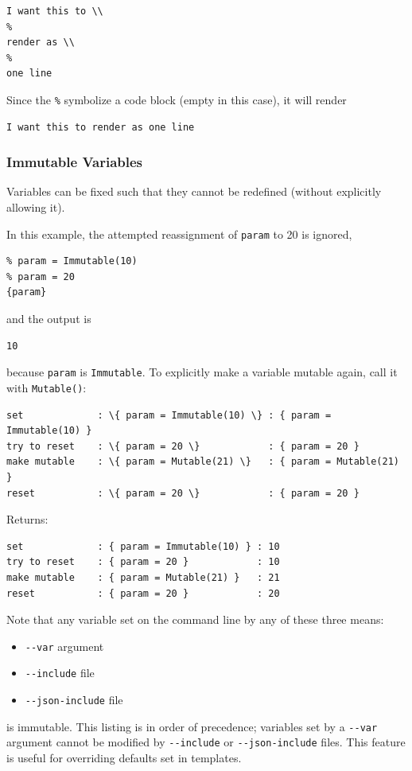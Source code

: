 {\begin{verbatim}
I want this to \\
%
render as \\
%
one line
\end{verbatim}
Since the \texttt{\%} symbolize a code block (empty in this case), it will render
\begin{verbatim}
I want this to render as one line
\end{verbatim}

\subsubsection{Immutable Variables}\label{interfaces:immutable-variables}

Variables can be fixed such that they cannot be redefined (without
explicitly allowing it).

In this example, the attempted reassignment of \texttt{param} to 20 is
ignored,

\begin{verbatim}
% param = Immutable(10)
% param = 20 
{param}
\end{verbatim}

and the output is

\begin{verbatim}
10
\end{verbatim}

because \texttt{param} is \texttt{Immutable}. To explicitly make a
variable mutable again, call it with \texttt{Mutable()}:

\begin{verbatim}
set             : \{ param = Immutable(10) \} : { param = Immutable(10) }           
try to reset    : \{ param = 20 \}            : { param = 20 }          
make mutable    : \{ param = Mutable(21) \}   : { param = Mutable(21) } 
reset           : \{ param = 20 \}            : { param = 20 }         
\end{verbatim}

Returns:

\begin{verbatim}
set             : { param = Immutable(10) } : 10
try to reset    : { param = 20 }            : 10
make mutable    : { param = Mutable(21) }   : 21
reset           : { param = 20 }            : 20
\end{verbatim}

Note that any variable set on the command line by any of these three means:
\begin{itemize}
 \item \texttt{-\/-var} argument 
 \item \texttt{-\/-include} file
 \item \texttt{-\/-json-include} file
\end{itemize}
is immutable. This listing is in order of precedence; variables set by a 
\texttt{-\/-var} argument cannot be modified by \texttt{-\/-include}
or \texttt{-\/-json-include} files. This feature is useful for overriding
defaults set in templates.

}
